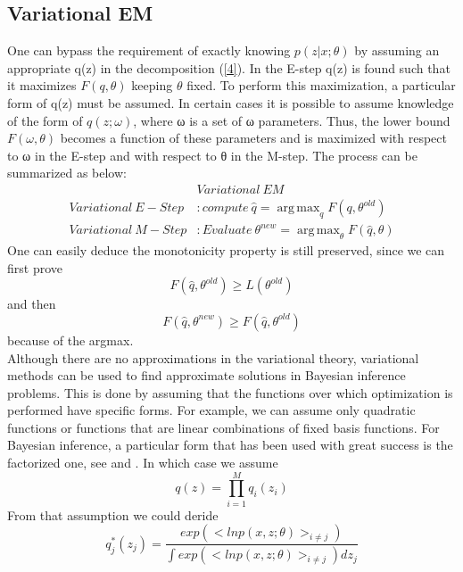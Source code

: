 \documentclass[11pt]{article}
\DeclareMathOperator*{\argmax}{arg\,max}
\begin{document}
\subsection{Variational EM}
One can bypass the requirement of exactly knowing $p(z|x;\theta)$ by assuming an appropriate q(z) in the decomposition (\ref{4})\cite{LifeAfter}. In the E-step q(z) is found such that it maximizes $F(q,\theta)$ keeping $\theta$ fixed. To perform this maximization, a particular
form of q(z) must be assumed. In certain cases it is possible to assume knowledge of the form of $q(z;\omega)$, where ω is a set of ω parameters. Thus, the lower bound $F(\omega,\theta)$ becomes a function of these parameters and is maximized with respect to ω in the E-step and with respect to θ in the M-step. The process can be summarized as below\cite{gentle}:
\begin{equation}
\begin{split}
&Variational~EM \\
Variational~E-Step &: compute~\hat{q} = \argmax_{q}F(q, \theta^{old})\\
Variational~M-Step &: Evaluate~\theta^{new}=\argmax_{\theta}F(\hat{q},\theta)
\end{split}
\end{equation}
One can easily deduce the monotonicity property is still preserved, since we can first prove
\begin{equation}
F(\hat{q},\theta^{old}) \geq L(\theta^{old})
\end{equation}
and then
\begin{equation}
F(\hat{q}, \theta^{new}) \geq F(\hat{q}, \theta^{old})
\end{equation}
because of the {argmax}.\\
Although there are no approximations in the variational theory, variational methods can be used to find approximate solutions in Bayesian inference problems. This is done by assuming that the functions over which optimization is performed have specific forms. For example, we can assume only quadratic functions or functions that are linear combinations of fixed basis functions. For Bayesian inference, a particular form that has been used with great success is the factorized one, see \cite{1var} and \cite{2var}. In which case we assume
\begin{equation}
q(z)=\prod^{M}_{i=1}q_i(z_i)
\end{equation} 
From that assumption we could deride \cite{LifeAfter}
\begin{equation}
q_j^*(z_j)=\frac{exp(<lnp(x,z;\theta)>_{i\neq j})}{\int exp(<lnp(x,z;\theta)>_{i\neq j})dz_j}
\end{equation}
\end{document}
